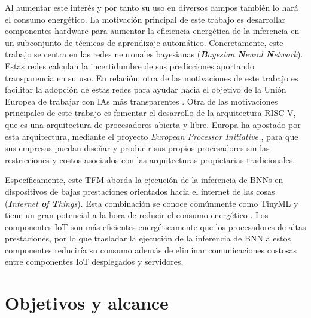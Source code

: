 Al aumentar este interés y por tanto su uso en diversos campos también lo hará el consumo energético. La motivación principal de este trabajo es desarrollar componentes hardware para aumentar la eficiencia energética de la inferencia en un subconjunto de técnicas de aprendizaje automático. Concretamente, este trabajo se centra en las redes neuronales bayesianas (\textit{\textbf{B}ayesian \textbf{N}eural \textbf{N}etwork}). Estas redes calculan la incertidumbre de sus predicciones aportando transparencia en su uso. En relación, otra de las motivaciones de este trabajo es facilitar la adopción de estas redes para ayudar hacia el objetivo de la Unión Europea de trabajar con IAs más transparentes \cite{eu_ai}. Otra de las motivaciones principales de este trabajo es fomentar el desarrollo de la arquitectura RISC-V, que es una arquitectura de procesadores abierta y libre. Europa ha apostado por esta arquitectura, mediante el proyecto \textit{European Processor Initiative} \cite{european_processor}, para que sus empresas puedan diseñar y producir sus propios procesadores sin las restricciones y costos asociados con las arquitecturas propietarias tradicionales. 

Específicamente, este TFM aborda la ejecución de la inferencia de BNNs en dispositivos de bajas prestaciones orientados hacia el internet de las cosas (\textit{\textbf{I}nternet \textbf{o}f \textbf{T}hings}). Esta combinación se conoce comúnmente como TinyML y tiene un gran potencial a la hora de reducir el consumo energético \cite{tinyML_sustainable}. Los componentes IoT son más eficientes energéticamente que los procesadores de altas prestaciones, por lo que trasladar la ejecución de la inferencia de BNN a estos componentes reduciría su consumo además de eliminar comunicaciones costosas entre componentes IoT desplegados y servidores.

\section{Objetivos y alcance}

